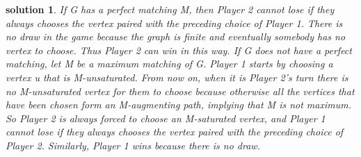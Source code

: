 \documentclass[twocolumn]{article}
\newtheorem{problem}{problem}
\newtheorem{solution}{solution}
\begin{document}
\begin{CJK*}{UTF8}{bkai}
\begin{solution}
 If G has a perfect matching M, then Player 2 cannot lose if they always chooses the vertex paired
 with the preceding choice of Player 1. There is no draw in the game because the graph is finite and
 eventually somebody has no vertex to choose. Thus Player 2 can win in this way.
 If G does not have a perfect matching, let M be a maximum matching of G. Player 1 starts by
 choosing a vertex u that is M-unsaturated. From now on, when it is Player 2's turn there is no
 M-unsaturated vertex for them to choose because otherwise all the vertices that have been chosen
 form an M-augmenting path, implying that M is not maximum. So Player 2 is always forced to
 choose an M-saturated vertex, and Player 1 cannot lose if they always chooses the vertex paired
 with the preceding choice of Player 2. Similarly, Player 1 wins because there is no draw.
\end{solution}

    

    


\end{CJK*}
\end{document}
